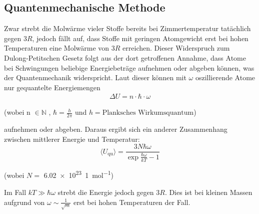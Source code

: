\subsection{Quantenmechanische Methode}
Zwar strebt die Molwärme vieler Stoffe bereits bei Zimmertemperatur tatächlich gegen $3R$, jedoch fällt auf, dass
Stoffe mit geringen Atomgewicht erst bei hohen Temperaturen eine Molwärme von $3R$ erreichen.
Dieser Widerspruch zum Dulong-Petitschen Gesetz folgt aus der dort getroffenen Annahme, dass Atome bei
Schwingungen beliebige Energiebeträge aufnehmen oder abgeben können, was der Quantenmechanik widerspricht.
Laut dieser können mit $\omega$ oszillierende Atome nur gequantelte Energiemengen
\begin{align}
  \Delta U= n\cdot \hbar \cdot \omega
\end{align}
\begin{center}
 \small {(wobei n  $\in \mathbb{N}$ , $\hbar =\frac{h}{2\pi}$ und $h = \text{Planksches Wirkumsquantum}$)}
\end{center}
aufnehmen oder abgeben.
Daraus ergibt sich ein anderer Zusammenhang zwischen mittlerer Energie und Temperatur:
\begin{equation}
  \langle U_\text{qu} \rangle=\frac{3N \hbar \omega}{\exp{\frac{\hbar \omega}{kT}}-1}
\end{equation}
\begin{center}
 \small {(wobei $N=$ \SI {6,02 e23}{1\per\mol})}
\end{center}
Im Fall $kT \gg \hbar \omega$ strebt die Energie jedoch gegen $3R$.
Dies ist bei kleinen Massen aufgrund von $\omega \sim \frac{1}{\sqrt{m}}$ erst bei hohen Temperaturen der Fall.
